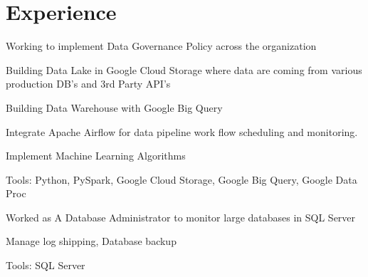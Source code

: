 \documentclass[letterpaper]{deedy-resume} %
\begin{document}
\hfill
%
%
\begin{minipage}[t]{0.66\textwidth} %


\section{Experience}


\vspace{\topsep} %
\begin{tightitemize}
\item Working to implement Data Governance Policy across the organization
\item Building Data Lake in Google Cloud Storage where data are coming from various production DB's and 3rd Party API's
\item Building Data Warehouse with Google Big Query
\item Integrate Apache Airflow for data pipeline work flow scheduling and monitoring.
\item Implement Machine Learning Algorithms
\item Tools: Python, PySpark, Google Cloud Storage, Google Big Query, Google Data Proc

\end{tightitemize}

\sectionspace %



\vspace{\topsep} %
\begin{tightitemize}
\item Worked as A Database Administrator to monitor large databases in SQL Server
\item Manage log shipping, Database backup
\item Tools: SQL Server


\end{tightitemize}
\end{minipage}
\end{document}
